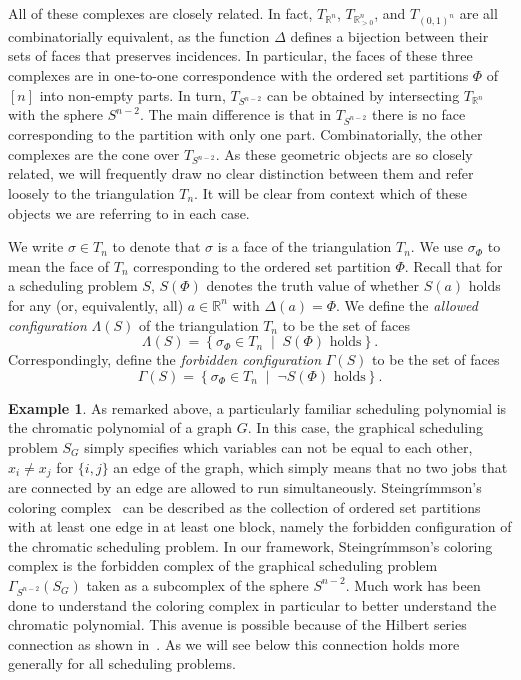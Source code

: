\documentclass[12pt,reqno]{amsart}
\numberwithin{definition}{section}
\theoremstyle{definition}
\newtheorem{example}[definition]{Example}
\newcommand{\RR}{\mathbb{R}}
\newcommand{\mset}[2]{ \left\{ #1 \; \middle| \; #2 \right\}}
\newcommand{\T}{T} %
\newcommand{\Tn}{T_n} %
\newcommand{\TRn}{\T_{\RR^n}} %
\newcommand{\TS}{\T_{S^{n-2}}} %
\newcommand{\TP}{\T_{\RR^n_{> 0}}} %
\newcommand{\TC}{\T_{(0,1)^n}} %
\newcommand{\allow}{\Lambda} %
\newcommand{\forb}{\Gamma} %
\newcommand{\forbS}{\forb_{S^{n-2}}} %
\begin{document}
All of these complexes are closely related. In fact, $\TRn$, $\TP$, and $\TC$ are all combinatorially equivalent, as the function $\Delta$ defines a bijection between their sets of faces that preserves incidences. In particular, the faces of these three complexes are in one-to-one correspondence with the ordered set partitions $\Phi$ of $[n]$ into non-empty parts. In turn, $\TS$ can be obtained by intersecting $\TRn$ with the sphere $S^{n-2}$. The main difference is that in $\TS$ there is no face corresponding to the partition with only one part. Combinatorially, the other complexes are the cone over $\TS$. As these geometric objects are so closely related, we will frequently draw no clear distinction between them and refer loosely to the triangulation $\Tn$. It will be clear from context which of these objects we are referring to in each case.

We write $\sigma\in\Tn$ to denote that $\sigma$ is a face of the triangulation $\Tn$. We use $\sigma_\Phi$ to mean the face of $\Tn$ corresponding to the ordered set partition $\Phi$.  Recall that for a scheduling problem $S$, $S(\Phi)$ denotes the truth value of whether $S(a)$ holds for any (or, equivalently, all) $a\in\RR^n$ with $\Delta(a)=\Phi$. We define the \emph{allowed configuration} $\allow(S)$ of the triangulation $\Tn$ to be the set of faces 
\[
  \allow(S) = \mset{\sigma_\Phi \in \Tn}{S(\Phi) \textrm{ holds}}.
\]
Correspondingly, define the \emph{forbidden configuration} $\forb(S)$ to be the set of faces
\[
  \forb(S) = \mset{\sigma_\Phi \in \Tn}{\neg S(\Phi) \textrm{ holds}}.
\]



\begin{example} As remarked above, a particularly familiar scheduling polynomial is the chromatic polynomial of a graph $G$.  In this case, the graphical scheduling problem $S_G$ simply specifies which variables can not be equal to each other, $x_i \neq x_j$ for $\{i,j\}$ an edge of the graph, which simply means that no two jobs that are connected by an edge are allowed to run simultaneously.   Steingr\'{i}mmson's coloring complex~\cite{Ein} can be described as
the collection of ordered set partitions with at least one edge in at least one block, namely 
the forbidden configuration of the chromatic scheduling problem. In our framework, Steingr\'{i}mmson's coloring complex is the forbidden complex of the graphical scheduling problem $\forbS(S_G)$ taken as a subcomplex of the sphere $S^{n-2}$.
Much work has been done to understand the coloring complex in particular to better understand the chromatic polynomial.  This avenue is possible because of the Hilbert series connection as shown in~\cite{Ein}.  As we will see below this connection holds more generally for all scheduling problems.
\end{example}
\end{document}

